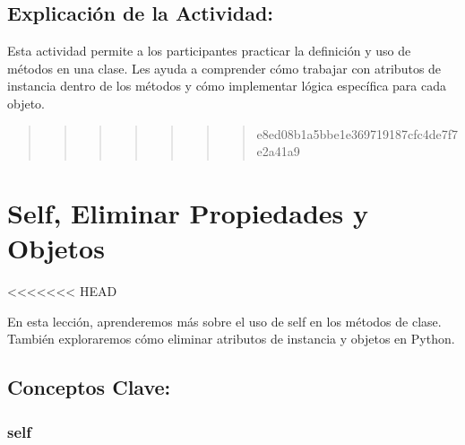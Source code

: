 \documentclass[
  a4paper,
  onepage,
  openany]{scrreprt}
\begin{document}
\hypertarget{explicaciuxf3n-de-la-actividad-51}{%
\section{Explicación de la
Actividad:}\label{explicaciuxf3n-de-la-actividad-51}}

Esta actividad permite a los participantes practicar la definición y uso
de métodos en una clase. Les ayuda a comprender cómo trabajar con
atributos de instancia dentro de los métodos y cómo implementar lógica
específica para cada objeto.

\begin{quote}
\begin{quote}
\begin{quote}
\begin{quote}
\begin{quote}
\begin{quote}
\begin{quote}
e8ed08b1a5bbe1e369719187cfc4de7f7e2a41a9
\end{quote}
\end{quote}
\end{quote}
\end{quote}
\end{quote}
\end{quote}
\end{quote}

\hypertarget{self-eliminar-propiedades-y-objetos}{%
\chapter{Self, Eliminar Propiedades y
Objetos}\label{self-eliminar-propiedades-y-objetos}}

\textless\textless\textless\textless\textless\textless\textless{} HEAD

En esta lección, aprenderemos más sobre el uso de self en los métodos de
clase. También exploraremos cómo eliminar atributos de instancia y
objetos en Python.

\hypertarget{conceptos-clave-54}{%
\section{Conceptos Clave:}\label{conceptos-clave-54}}

\hypertarget{self}{%
\subsection{self}\label{self}}
\end{document}
